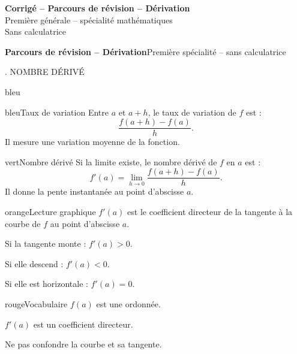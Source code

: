 \documentclass[11pt,a4paper]{article}
\newcommand{\tagcol}[2]{\begin{tcolorbox}[enhanced,colback=#1!11,colframe=#1!45!black,boxrule=0.42pt,arc=2mm,left=1mm,right=1mm,top=0.45mm,bottom=0.45mm,before skip=0mm,after skip=0.85mm,fontupper=\bfseries\scriptsize,colupper=#1!55!black]\centering #2\end{tcolorbox}}
\newcommand{\titrepage}{\begin{tcolorbox}[colback=white,colframe=bleu!70!black,boxrule=0.65pt,arc=3mm,left=2.5mm,right=2.5mm,top=1.15mm,bottom=1.15mm,before skip=0mm,after skip=1.4mm,drop fuzzy shadow=black!10]
{\Large\bfseries Parcours de révision -- Dérivation}\hfill {\normalsize Première spécialité -- sans calculatrice}
\end{tcolorbox}}
\begin{document}
\begin{center}
{\LARGE\bfseries Corrigé -- Parcours de révision -- Dérivation}\\[1mm]
{\large Première générale -- spécialité mathématiques}\\[1mm]
{\normalsize Sans calculatrice}
\end{center}
\vspace{2mm}
\tableofcontents
\clearpage

{}
\pagestyle{empty}
\begin{landscape}
\pagecolor{fondpage}\color{encre}
\thispagestyle{empty}

\fontsize{7.85}{8.45}\selectfont

\titrepage

\noindent
\begin{minipage}[t]{0.242\linewidth}
\tagcol{bleu}{1. NOMBRE DÉRIVÉ}
\begin{panel}{bleu}

\begin{fichebox}{bleu}{Taux de variation}
Entre $a$ et $a+h$, le taux de variation de $f$ est :
\[
\frac{f(a+h)-f(a)}{h}.
\]
Il mesure une variation moyenne de la fonction.
\end{fichebox}

\begin{fichebox}{vert}{Nombre dérivé}
Si la limite existe, le nombre dérivé de $f$ en $a$ est :
\[
 f'(a)=\lim_{h\to0}\frac{f(a+h)-f(a)}{h}.
\]
Il donne la pente instantanée au point d'abscisse $a$.
\end{fichebox}

\begin{fichebox}{orange}{Lecture graphique}
$f'(a)$ est le coefficient directeur de la tangente à la courbe de $f$ au point d'abscisse $a$.

Si la tangente monte : $f'(a)>0$.

Si elle descend : $f'(a)<0$.

Si elle est horizontale : $f'(a)=0$.
\end{fichebox}

\begin{fichebox}{rouge}{Vocabulaire}
$f(a)$ est une ordonnée.

$f'(a)$ est un coefficient directeur.

Ne pas confondre la courbe et sa tangente.
\end{fichebox}


\end{panel}
\end{minipage}
\end{landscape}
\end{document}
